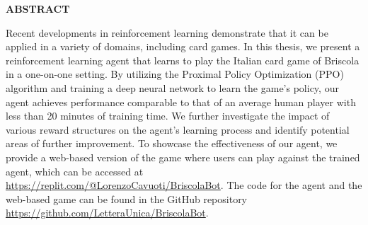 \begin{center}
    \bf ABSTRACT
\end{center}
Recent developments in reinforcement learning demonstrate that it can be applied in a variety of domains, including card games. In this thesis, we present a reinforcement learning agent that learns to play the Italian card game of Briscola in a one-on-one setting. By utilizing the Proximal Policy Optimization (PPO) algorithm and training a deep neural network to learn the game's policy, our agent achieves performance comparable to that of an average human player with less than 20 minutes of training time. We further investigate the impact of various reward structures on the agent's learning process and identify potential areas of further improvement. To showcase the effectiveness of our agent, we provide a web-based version of the game where users can play against the trained agent, which can be accessed at \href{https://replit.com/@LorenzoCavuoti/BriscolaBot}{https://replit.com/@LorenzoCavuoti/BriscolaBot}. The code for the agent and the web-based game can be found in the GitHub repository \href{https://github.com/LetteraUnica/BriscolaBot}{https://github.com/LetteraUnica/BriscolaBot}.